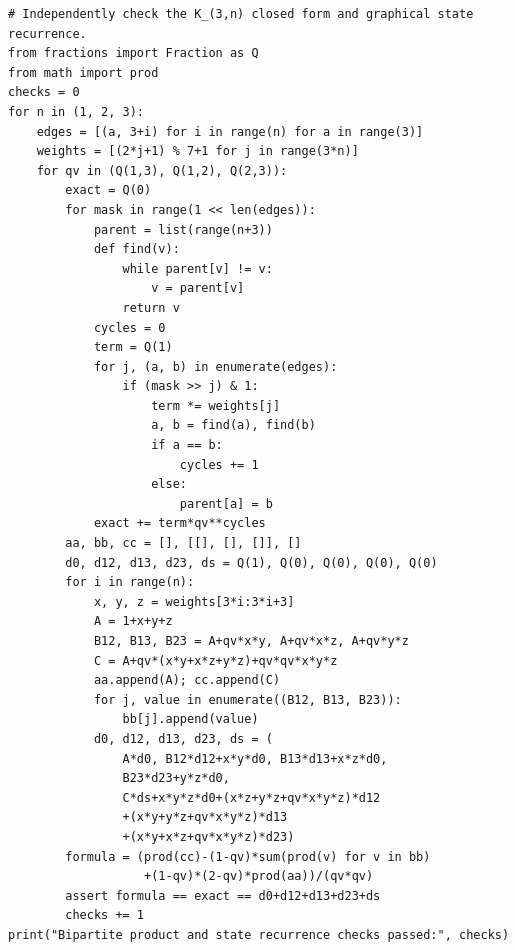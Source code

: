 \documentclass[11pt,a4paper]{article}
\theoremstyle{definition}
\theoremstyle{remark}\newtheorem{remark}[theorem]{Remark}
\begin{document}
\begin{lstlisting}
# Independently check the K_(3,n) closed form and graphical state recurrence.
from fractions import Fraction as Q
from math import prod
checks = 0
for n in (1, 2, 3):
    edges = [(a, 3+i) for i in range(n) for a in range(3)]
    weights = [(2*j+1) % 7+1 for j in range(3*n)]
    for qv in (Q(1,3), Q(1,2), Q(2,3)):
        exact = Q(0)
        for mask in range(1 << len(edges)):
            parent = list(range(n+3))
            def find(v):
                while parent[v] != v:
                    v = parent[v]
                return v
            cycles = 0
            term = Q(1)
            for j, (a, b) in enumerate(edges):
                if (mask >> j) & 1:
                    term *= weights[j]
                    a, b = find(a), find(b)
                    if a == b:
                        cycles += 1
                    else:
                        parent[a] = b
            exact += term*qv**cycles
        aa, bb, cc = [], [[], [], []], []
        d0, d12, d13, d23, ds = Q(1), Q(0), Q(0), Q(0), Q(0)
        for i in range(n):
            x, y, z = weights[3*i:3*i+3]
            A = 1+x+y+z
            B12, B13, B23 = A+qv*x*y, A+qv*x*z, A+qv*y*z
            C = A+qv*(x*y+x*z+y*z)+qv*qv*x*y*z
            aa.append(A); cc.append(C)
            for j, value in enumerate((B12, B13, B23)):
                bb[j].append(value)
            d0, d12, d13, d23, ds = (
                A*d0, B12*d12+x*y*d0, B13*d13+x*z*d0,
                B23*d23+y*z*d0,
                C*ds+x*y*z*d0+(x*z+y*z+qv*x*y*z)*d12
                +(x*y+y*z+qv*x*y*z)*d13
                +(x*y+x*z+qv*x*y*z)*d23)
        formula = (prod(cc)-(1-qv)*sum(prod(v) for v in bb)
                   +(1-qv)*(2-qv)*prod(aa))/(qv*qv)
        assert formula == exact == d0+d12+d13+d23+ds
        checks += 1
print("Bipartite product and state recurrence checks passed:", checks)
\end{lstlisting}
\end{document}
